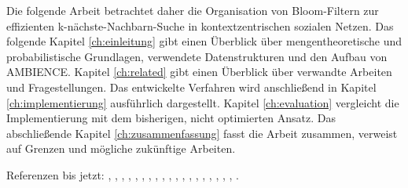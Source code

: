 Die folgende Arbeit betrachtet daher die Organisation von Bloom-Filtern zur effizienten k-nächste-Nachbarn-Suche in kontextzentrischen sozialen Netzen. Das folgende Kapitel \ref{ch:einleitung} gibt einen Überblick über mengentheoretische und probabilistische Grundlagen, verwendete Datenstrukturen und den Aufbau von AMBIENCE. Kapitel \ref{ch:related} gibt einen Überblick über verwandte Arbeiten und Fragestellungen. Das entwickelte Verfahren wird anschließend in Kapitel \ref{ch:implementierung} ausführlich dargestellt. Kapitel \ref{ch:evaluation} vergleicht die Implementierung mit dem bisherigen, nicht optimierten Ansatz. Das abschließende Kapitel \ref{ch:zusammenfassung} fasst die Arbeit zusammen, verweist auf Grenzen und mögliche zukünftige Arbeiten. 

Referenzen bis jetzt: \cite{Agarwal2006}, \cite{Ahlgren2012}, \cite{Bayardo2007}, \cite{Broder2004}, \cite{Byers2002}, \cite{Duerr2010}, \cite{Hellerstein1994}, \cite{Lehman1986}, \cite{Nafe2005}, \cite{Qiao2014}, \cite{Ruppel2014}, \cite{Sarwat2012}, \cite{Schnell2013}, \cite{Schoenfeld2014}, \cite{Shiraki2009}, \cite{Werner2015}, \cite{Yang2002}, \cite{Zhang2012}, \cite{Zhu2004}, \cite{Jannink1995}.
